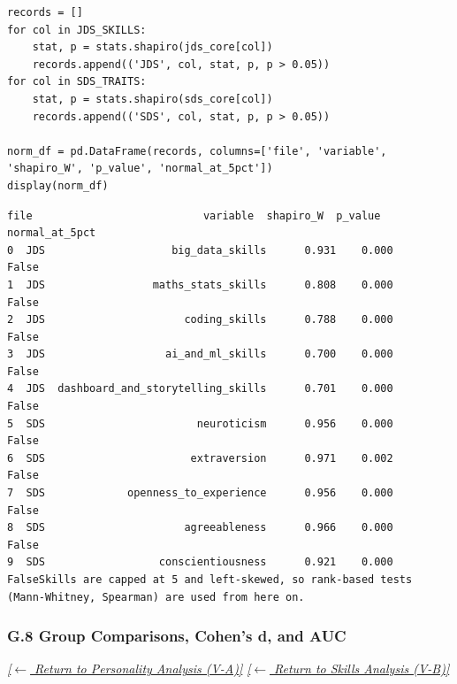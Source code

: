\documentclass[conference]{IEEEtran}
\begin{document}
\begin{lstlisting}[style=pythonstyle,caption={Shapiro-Wilk normality tests across skill proficiencies and personality traits.},label={lst:normality_code}]
records = []
for col in JDS_SKILLS:
    stat, p = stats.shapiro(jds_core[col])
    records.append(('JDS', col, stat, p, p > 0.05))
for col in SDS_TRAITS:
    stat, p = stats.shapiro(sds_core[col])
    records.append(('SDS', col, stat, p, p > 0.05))

norm_df = pd.DataFrame(records, columns=['file', 'variable', 'shapiro_W', 'p_value', 'normal_at_5pct'])
display(norm_df)
\end{lstlisting}

\begin{lstlisting}[style=outputstyle,caption={Execution Output G.7: Shapiro-Wilk Test Summary.},label={out:normality}]
file                           variable  shapiro_W  p_value  normal_at_5pct
0  JDS                    big_data_skills      0.931    0.000           False
1  JDS                 maths_stats_skills      0.808    0.000           False
2  JDS                      coding_skills      0.788    0.000           False
3  JDS                   ai_and_ml_skills      0.700    0.000           False
4  JDS  dashboard_and_storytelling_skills      0.701    0.000           False
5  SDS                        neuroticism      0.956    0.000           False
6  SDS                       extraversion      0.971    0.002           False
7  SDS             openness_to_experience      0.956    0.000           False
8  SDS                      agreeableness      0.966    0.000           False
9  SDS                  conscientiousness      0.921    0.000           FalseSkills are capped at 5 and left-skewed, so rank-based tests (Mann-Whitney, Spearman) are used from here on.
\end{lstlisting}

\subsubsection*{G.8 Group Comparisons, Cohen's d, and AUC}
\label{lst:sds_effects}\label{lst:jds_effects}
\textit{\hyperref[sec:personality_analysis]{[$\leftarrow$ Return to Personality Analysis (V-A)]}} \quad \textit{\hyperref[sec:skills_analysis]{[$\leftarrow$ Return to Skills Analysis (V-B)]}}
\end{document}
